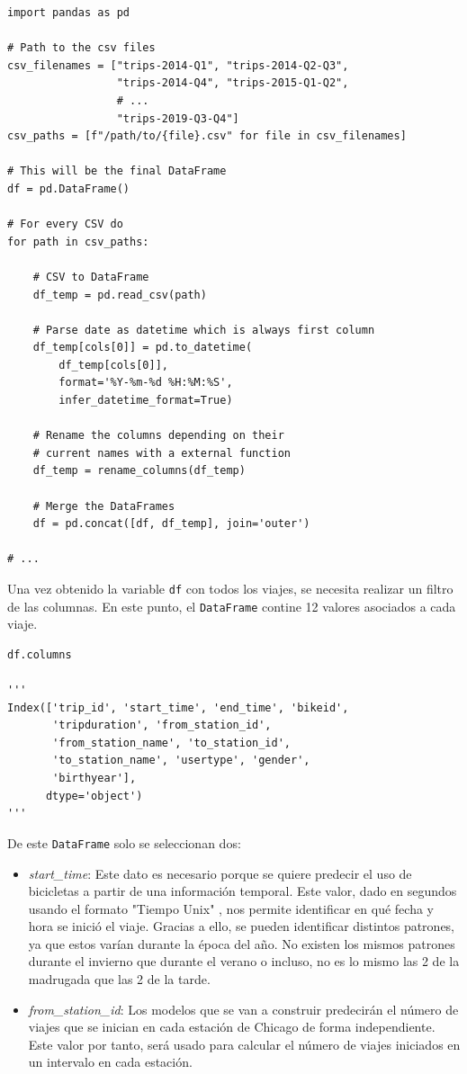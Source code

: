 \begin{verbatim}
import pandas as pd

# Path to the csv files
csv_filenames = ["trips-2014-Q1", "trips-2014-Q2-Q3", 
                 "trips-2014-Q4", "trips-2015-Q1-Q2",
                 # ...
                 "trips-2019-Q3-Q4"]
csv_paths = [f"/path/to/{file}.csv" for file in csv_filenames]

# This will be the final DataFrame
df = pd.DataFrame()

# For every CSV do
for path in csv_paths:
    
    # CSV to DataFrame
    df_temp = pd.read_csv(path)
    
    # Parse date as datetime which is always first column
    df_temp[cols[0]] = pd.to_datetime(
        df_temp[cols[0]], 
        format='%Y-%m-%d %H:%M:%S',
        infer_datetime_format=True)
    
    # Rename the columns depending on their
    # current names with a external function
    df_temp = rename_columns(df_temp)
    
    # Merge the DataFrames
    df = pd.concat([df, df_temp], join='outer')

# ...
\end{verbatim}

Una vez obtenido la variable \verb|df| con todos los viajes, se necesita realizar un filtro de las columnas. En este punto, el \verb|DataFrame| contine 12 valores asociados a cada viaje.

\begin{verbatim}
df.columns

'''
Index(['trip_id', 'start_time', 'end_time', 'bikeid', 
       'tripduration', 'from_station_id', 
       'from_station_name', 'to_station_id',
       'to_station_name', 'usertype', 'gender',
       'birthyear'],
      dtype='object')
'''
\end{verbatim}

De este \verb|DataFrame| solo se seleccionan dos:

\begin{itemize}
    \item \textit{start\_time}: Este dato es necesario porque se quiere predecir el uso de bicicletas a partir de una información temporal. Este valor, dado en segundos usando el formato "Tiempo Unix" \cite{unix_time}, nos permite identificar en qué fecha y hora se inició el viaje. Gracias a ello, se pueden identificar distintos patrones, ya que estos varían durante la época del año. No existen los mismos patrones durante el invierno que durante el verano o incluso, no es lo mismo las 2 de la madrugada que las 2 de la tarde.
    \item \textit{from\_station\_id}: Los modelos que se van a construir predecirán el número de viajes que se inician en cada estación de Chicago de forma independiente. Este valor por tanto, será usado para calcular el número de viajes iniciados en un intervalo en cada estación.
\end{itemize}

